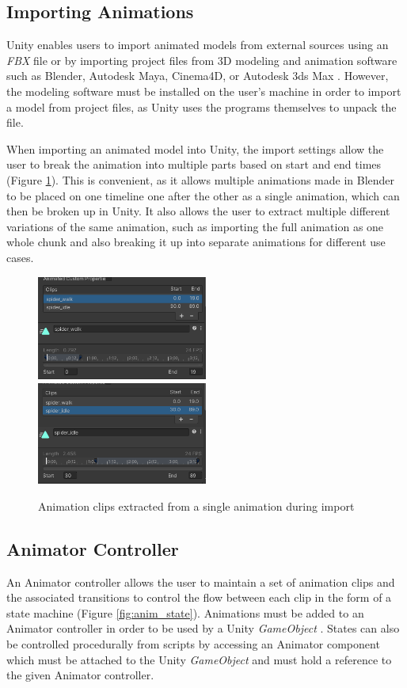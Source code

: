 \subsection{Importing Animations}
Unity enables users to import animated models from external sources using an
\textit{FBX} file or by importing project files from 3D modeling and animation
software such as Blender, Autodesk Maya, Cinema4D, or Autodesk 3ds Max
\cite{unity_import}. However, the modeling software must be installed on the
user's machine in order to import a model from project files, as Unity uses the
programs themselves to unpack the file. 

When importing an animated model into Unity, the import settings allow the user
to break the animation into multiple parts based on start and end times (Figure
\ref{fig:anim_chunk}). This is convenient, as it allows multiple animations made
in Blender to be placed on one timeline one after the other as a single
animation, which can then be broken up in Unity. It also allows the user to
extract multiple different variations of the same animation, such as importing
the full animation as one whole chunk and also breaking it up into separate
animations for different use cases.

\begin{figure}
    \includegraphics[width=0.5\textwidth]{grafika/animation_chunk_1.png}
    \includegraphics[width=0.5\textwidth]{grafika/animation_chunk_2.png}
    \caption{Animation clips extracted from a single animation during import}
    \label{fig:anim_chunk}
\end{figure}

\subsection{Animator Controller}
An Animator controller allows the user to maintain a set of animation clips and
the associated transitions to control the flow between each clip in the form of
a state machine (Figure \ref{fig:anim_state}). Animations must be added to an
Animator controller in order to be used by a Unity \textit{GameObject}
\cite{unity_animator}. States can also be controlled procedurally from scripts
by accessing an Animator component which must be attached to the Unity
\textit{GameObject} and must hold a reference to the given Animator controller.
 
